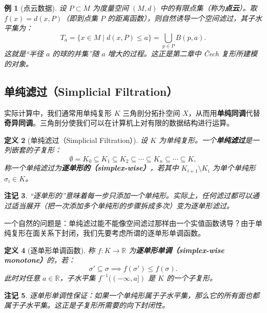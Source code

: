 \documentclass[UTF8]{ctexart}
\newtheorem{definition}{定义}[section]
\newtheorem{remark}[definition]{注记}
\newtheorem{example}[definition]{例}
\begin{document}
\begin{example}[点云数据]
\label{ex:point-cloud-filtration}
设 \(P \subset M\) 为度量空间 \((M,d)\) 中的有限点集（称为\textbf{点云}）。取 \(f(x) = d(x, P)\)（即到点集 \(P\) 的距离函数），则自然诱导一个空间滤过，其子水平集为：
\[
T_a = \{x \in M \mid d(x, P) \le a\} = \bigcup_{p \in P} B(p, a).
\]
这就是“半径 \(a\) 的球的并集”随 \(a\) 增大的过程。这正是第二章中 Čech 复形所建模的对象。
\end{example}

\subsection{单纯滤过（Simplicial Filtration）}
\label{subsec:simplicial-filtration}

实际计算中，我们通常用单纯复形 \(K\) 三角剖分拓扑空间 \(X\)，从而用\textbf{单纯同调}代替\textbf{奇异同调}。三角剖分使我们可以在计算机上对有限的数据结构进行运算。

\begin{definition}[单纯滤过（Simplicial Filtration）]
\label{def:simplicial-filtration}
设 \(K\) 为单纯复形。一个\textbf{单纯滤过}是一列嵌套的子复形：
\[
\emptyset = K_0 \subseteq K_1 \subseteq K_2 \subseteq \cdots \subseteq K_n \subseteq \cdots \subseteq K,
\]
称一个单纯滤过为\textbf{逐单形的（simplex-wise）}，若其中 \(K_{i+1} \setminus K_i\) 为单个单纯形 \(\sigma_i \in K\)。
\end{definition}

\begin{remark}
“逐单形的”意味着每一步只添加一个单纯形。实际上，任何滤过都可以通过适当展开（把一次添加多个单纯形的步骤拆成多次）变为逐单形滤过。
\end{remark}

一个自然的问题是：单纯滤过能不能像空间滤过那样由一个实值函数诱导？由于单纯复形在面关系下封闭，我们先要考虑所谓的逐单形单调函数。

\begin{definition}[逐单形单调函数]
\label{def:simplex-wise-monotone}
称 \(f: K \to \mathbb{R}\) 为\textbf{逐单形单调（simplex-wise monotone）}的，若：
\[
\sigma' \subseteq \sigma \implies f(\sigma') \le f(\sigma).
\]
此时对任意 \(a \in \mathbb{R}\)，子水平集 \(f^{-1}((-\infty, a])\) 是 \(K\) 的一个子复形。
\end{definition}

\begin{remark}
逐单形单调性保证：如果一个单纯形属于子水平集，那么它的所有面也都属于子水平集。这正是子复形所需要的向下封闭性。
\end{remark}
\end{document}

